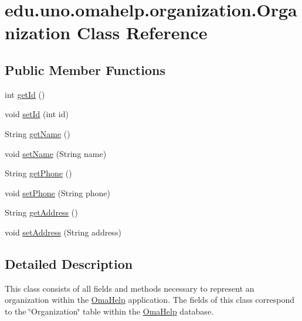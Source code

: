 \hypertarget{classedu_1_1uno_1_1omahelp_1_1organization_1_1_organization}{}\section{edu.\+uno.\+omahelp.\+organization.\+Organization Class Reference}
\label{classedu_1_1uno_1_1omahelp_1_1organization_1_1_organization}
\subsection*{Public Member Functions}
\begin{DoxyCompactItemize}
\item 
int \mbox{\hyperlink{classedu_1_1uno_1_1omahelp_1_1organization_1_1_organization_a093bea98e9c87f0f2aabe2800818f250}{get\+Id}} ()
\item 
void \mbox{\hyperlink{classedu_1_1uno_1_1omahelp_1_1organization_1_1_organization_a07240d703aa44148f50d70d168c34967}{set\+Id}} (int id)
\item 
String \mbox{\hyperlink{classedu_1_1uno_1_1omahelp_1_1organization_1_1_organization_ab45cf83c988c833389e64df2b4c7109e}{get\+Name}} ()
\item 
void \mbox{\hyperlink{classedu_1_1uno_1_1omahelp_1_1organization_1_1_organization_a2db8d9b7280b758389498f9c20542991}{set\+Name}} (String name)
\item 
String \mbox{\hyperlink{classedu_1_1uno_1_1omahelp_1_1organization_1_1_organization_aa01e14bd540cd9aa656ed01c21198ee8}{get\+Phone}} ()
\item 
void \mbox{\hyperlink{classedu_1_1uno_1_1omahelp_1_1organization_1_1_organization_a3484f8aa497b3d954230aa0d5bf149ad}{set\+Phone}} (String phone)
\item 
String \mbox{\hyperlink{classedu_1_1uno_1_1omahelp_1_1organization_1_1_organization_aad00e17c232efa1344e70e198dae5d64}{get\+Address}} ()
\item 
void \mbox{\hyperlink{classedu_1_1uno_1_1omahelp_1_1organization_1_1_organization_ad8d0c35f8b17c27471984b54a0d6d6a0}{set\+Address}} (String address)
\end{DoxyCompactItemize}


\subsection{Detailed Description}
This class consists of all fields and methods necessary to represent an organization within the \mbox{\hyperlink{classedu_1_1uno_1_1omahelp_1_1_oma_help}{Oma\+Help}} application. The fields of this class correspond to the \char`\"{}\+Organization\char`\"{} table within the \mbox{\hyperlink{classedu_1_1uno_1_1omahelp_1_1_oma_help}{Oma\+Help}} database. 

